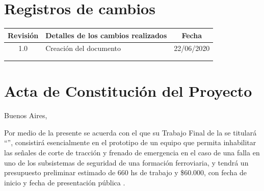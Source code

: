 \documentclass[11pt]{charter}
\begin{document}
\maketitle
\thispagestyle{empty}
\pagebreak


\thispagestyle{empty}
{\setlength{\parskip}{0pt}
\tableofcontents{}
}
\pagebreak


\section{Registros de cambios}
\label{sec:registro}


\begin{table}[ht]
\label{tab:registro}
\centering

\begin{tabularx}{\linewidth}{@{}|c|X|c|@{}}
\hline
\rowcolor[HTML]{C0C0C0} 
Revisión & \multicolumn{1}{c|}{\cellcolor[HTML]{C0C0C0}Detalles de los cambios realizados} & Fecha      \\ \hline
1.0      & Creación del documento                                                          & 22/06/2020 \\ \hline
         & & \\ \hline
         & & \\ \hline
\end{tabularx}
\end{table}

\pagebreak



\section{Acta de Constitución del Proyecto}
\label{sec:acta}

\begin{flushright}
Buenos Aires, \fechaInicioName
\end{flushright}

\vspace{2cm}

Por medio de la presente se acuerda con el \authorname\hspace{1px} que su Trabajo Final de la \degreename\hspace{1px} 
se titulará ``\ttitle'', consistirá esencialmente en el prototipo de un equipo que permita inhabilitar las señales de 
corte de tracción y frenado de emergencia en el caso de una falla en uno de los subsistemas de seguridad de una 
formación ferroviaria, y tendrá un presupuesto preliminar estimado de 660 hs de trabajo y \$60.000, con 
fecha de inicio \fechaInicioName\hspace{1px} y fecha de presentación pública \fechaFinalName.
\end{document}
